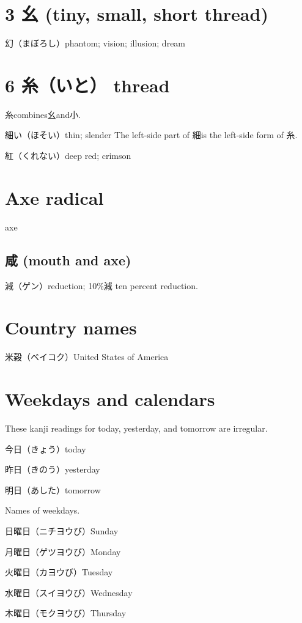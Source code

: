 \section{3 幺 (tiny, small, short thread)}

幻（まぼろし）phantom; vision; illusion; dream

\section{6 糸（いと） thread}

糸combines幺and小.

細い（ほそい）thin; slender
The left-side part of 細is the left-side form of 糸.

紅（くれない）deep red; crimson

\section{Axe radical}

axe

\subsection{咸 (mouth and axe)}

減（ゲン）reduction; 10\%減 ten percent reduction.

\section{Country names}

米穀（ベイコク）United States of America

\section{Weekdays and calendars}

These kanji readings for today, yesterday, and tomorrow are irregular.

今日（きょう）today

昨日（きのう）yesterday

明日（あした）tomorrow

Names of weekdays.

日曜日（ニチヨウび）Sunday

月曜日（ゲツヨウび）Monday

火曜日（カヨウび）Tuesday

水曜日（スイヨウび）Wednesday

木曜日（モクヨウび）Thursday


